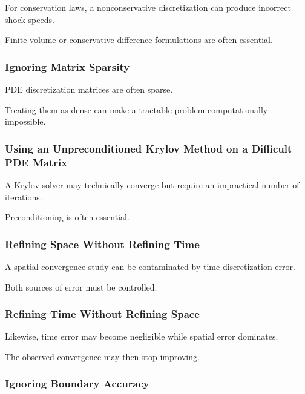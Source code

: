 For conservation laws, a nonconservative discretization can produce
incorrect shock speeds.

Finite-volume or conservative-difference formulations are often essential.

\subsubsection{Ignoring Matrix Sparsity}

PDE discretization matrices are often sparse.

Treating them as dense can make a tractable problem computationally
impossible.

\subsubsection{Using an Unpreconditioned Krylov Method on a Difficult PDE Matrix}

A Krylov solver may technically converge but require an impractical number
of iterations.

Preconditioning is often essential.

\subsubsection{Refining Space Without Refining Time}

A spatial convergence study can be contaminated by time-discretization
error.

Both sources of error must be controlled.

\subsubsection{Refining Time Without Refining Space}

Likewise, time error may become negligible while spatial error dominates.

The observed convergence may then stop improving.

\subsubsection{Ignoring Boundary Accuracy}

